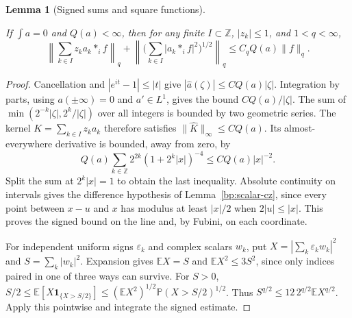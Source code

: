 \documentclass[11pt,letterpaper]{article}
\newtheorem{lemma}[theorem]{Lemma}
\theoremstyle{definition}
\newcommand{\E}{\mathbb E}
\newcommand{\ind}{\mathbf1}
\providecommand{\lean}[1]{}
\providecommand{\uses}[1]{}
\begin{document}
\begin{lemma}[Signed sums and square functions]\label{bp:profile-square}
\lean{TwistedParaproduct.profileSquare}
If \(\int a=0\) and \(Q(a)<\infty\), then for any finite
\(I\subset\mathbb Z\), \(|z_k|\le1\), and \(1<q<\infty\),
\[
 \left\|\sum_{k\in I} z_k a_k*_i f\right\|_q+
 \left\|\Big(\sum_{k\in I}|a_k*_i f|^2\Big)^{1/2}\right\|_q
 \le C_q Q(a)\|f\|_q .
\]
\end{lemma}
\begin{proof}
\uses{bp:scalar-cz}
Cancellation and \(|e^{it}-1|\le|t|\) give
\(|\widehat a(\zeta)|\le C Q(a)|\zeta|\). Integration by parts,
using \(a(\pm\infty)=0\) and \(a'\in L^1\), gives the bound
\(C Q(a)/|\zeta|\). The sum of
\(\min(2^{-k}|\zeta|,2^k/|\zeta|)\) over all integers is bounded by
two geometric series. The kernel \(K=\sum_{k\in I}z_k a_k\) therefore
satisfies \(\|\widehat K\|_\infty\le C Q(a)\). Its almost-everywhere
derivative is bounded, away from zero, by
\[
 Q(a)\sum_{k\in\mathbb Z}2^{2k}(1+2^k|x|)^{-4}
 \le C Q(a)|x|^{-2}.
\]
Split the sum at \(2^k |x|=1\) to obtain the last inequality.
Absolute continuity on intervals gives the difference hypothesis of
Lemma~\ref{bp:scalar-cz}, since every point between \(x-u\) and \(x\)
has modulus at least \(|x|/2\) when \(2|u|\le |x|\). This proves the
signed bound on the line and, by Fubini, on each coordinate.

For independent uniform signs \(\varepsilon_k\) and complex scalars
\(w_k\), put \(X=|\sum_k\varepsilon_k w_k|^2\) and \(S=\sum_k|w_k|^2\).
Expansion gives \(\E X=S\) and \(\E X^2\le3 S^2\), since only
indices paired in one of three ways can survive. For \(S>0\),
\(S/2\le\E[X\ind_{\{X>S/2\}}]\le(\E X^2)^{1/2}
\mathbb P(X>S/2)^{1/2}\). Thus \(S^{q/2}\le12\,2^{q/2}\E X^{q/2}\).
Apply this pointwise and integrate the signed estimate.
\end{proof}
\end{document}
